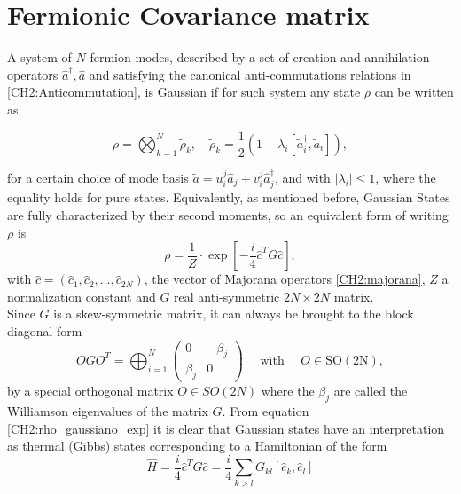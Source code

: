\section{Fermionic Covariance matrix }
A system of $N$ fermion modes, described by a set of creation and annihilation operators $\hat{a}^{\dagger}, \hat{a}$  and satisfying the  canonical anti-commutations relations in \eqref{CH2:Anticommutation}, is Gaussian if for such system any state $\rho$ can be written as  \cite{cheong_many-body_2003}

\begin{equation}
\rho=\bigotimes_{k=1}^{N} \tilde{\rho}_{k}, \quad \tilde{\rho}_{k}=\frac{1}{2}\left(1-\lambda_{i}\left[\tilde{a}_{i}^{\dagger}, \tilde{a}_{i}\right]\right),
\label{CH2:rho_gaussiano_no_exp}
\end{equation}

for a certain choice of mode basis $\tilde{a}=u_{i}^{j}\hat{a}_{j} + v_{i}^{j}\hat{a}_{j}^{\dagger}$, and with $|\lambda_i|\leq 1$, where the equality holds for pure states. Equivalently, as mentioned before, Gaussian States are fully characterized by their second moments, so an equivalent form of writing $\rho$ is
\begin{equation}
\rho= \frac{1}{Z}\cdot \exp \left[-\frac{i}{4} \hat{c}^{T} G \hat{c}\right],
\label{CH2:rho_gaussiano_exp}
\end{equation}
with $\hat{c} = (\hat{c}_1,\hat{c}_2,\ldots,\hat{c}_{2N})$, the vector of Majorana operators \eqref{CH2:majorana}, $Z$ a normalization constant and $G$ real anti-symmetric $2N\times 2N$ matrix. \\
\indent Since $G$ is a skew-symmetric matrix, it can always be brought to the block diagonal form 
\begin{equation}
O G O^{T}=\bigoplus_{i=1}^{N}\left(\begin{array}{cc}
0 & -\beta_{j} \\
\beta_{j} & 0
\end{array}\right) \quad \text { with } \quad O \in \mathrm{SO}(2 \mathrm{N}),
\label{CH2:MatrixG_Williamson}
\end{equation}
by a special orthogonal matrix $O\in SO(2N)$ where the $\beta_{j}$ are called the Williamson eigenvalues of the matrix $G$. 
\indent From equation \eqref{CH2:rho_gaussiano_exp} it is clear that Gaussian states have an interpretation as thermal (Gibbs) states corresponding to a Hamiltonian of the form
\begin{equation}
\hat{H}=\frac{i}{4} \hat{c}^{T}G\hat{c}= \frac{i}{4} \sum_{k>l}G_{kl}\left[\hat{c}_{k},\hat{c}_{l}\right]
\label{CH2:Hamiltonian_majorana}
\end{equation}

